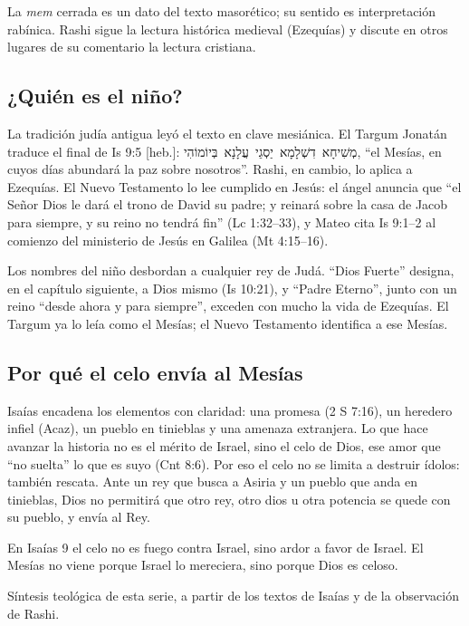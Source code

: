 \documentclass[11pt,letterpaper]{article}
\newcommand{\heb}[1]{\mbox{\foreignlanguage{hebrew}{#1}}}
\begin{document}
\begin{nota}[Precisión]
La \emph{mem} cerrada es un dato del texto masorético; su sentido es interpretación rabínica. Rashi sigue la lectura histórica medieval (Ezequías) y discute en otros lugares de su comentario la lectura cristiana.
\end{nota}

\subsection{¿Quién es el niño?}
La tradición judía antigua leyó el texto en clave mesiánica. El Targum Jonatán traduce el final de Is 9:5 [heb.]: \heb{מְשִׁיחָא דִשְׁלָמָא יַסְגֵי עֲלָנָא בְּיוֹמוֹהִי}, ``el Mesías, en cuyos días abundará la paz sobre nosotros''. Rashi, en cambio, lo aplica a Ezequías. El Nuevo Testamento lo lee cumplido en Jesús: el ángel anuncia que ``el Señor Dios le dará el trono de David su padre; y reinará sobre la casa de Jacob para siempre, y su reino no tendrá fin'' (Lc 1:32--33), y Mateo cita Is 9:1--2 al comienzo del ministerio de Jesús en Galilea (Mt 4:15--16).

Los nombres del niño desbordan a cualquier rey de Judá. ``Dios Fuerte'' designa, en el capítulo siguiente, a Dios mismo (Is 10:21), y ``Padre Eterno'', junto con un reino ``desde ahora y para siempre'', exceden con mucho la vida de Ezequías. El Targum ya lo leía como el Mesías; el Nuevo Testamento identifica a ese Mesías.

\subsection{Por qué el celo envía al Mesías}
Isaías encadena los elementos con claridad: una promesa (2 S 7:16), un heredero infiel (Acaz), un pueblo en tinieblas y una amenaza extranjera. Lo que hace avanzar la historia no es el mérito de Israel, sino el celo de Dios, ese amor que ``no suelta'' lo que es suyo (Cnt 8:6). Por eso el celo no se limita a destruir ídolos: también rescata. Ante un rey que busca a Asiria y un pueblo que anda en tinieblas, Dios no permitirá que otro rey, otro dios u otra potencia se quede con su pueblo, y envía al Rey.

En Isaías 9 el celo no es fuego contra Israel, sino ardor a favor de Israel. El Mesías no viene porque Israel lo mereciera, sino porque Dios es celoso.

\begin{nota}[Precisión]
Síntesis teológica de esta serie, a partir de los textos de Isaías y de la observación de Rashi.
\end{nota}
\end{document}
